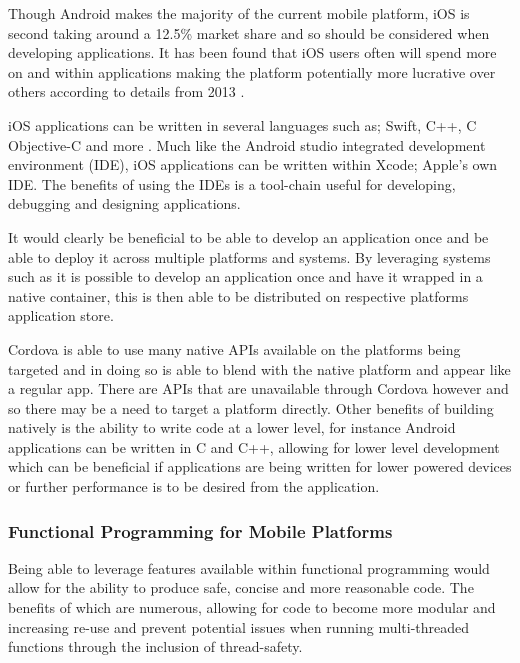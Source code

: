 Though Android makes the majority of the current mobile platform, iOS is
second taking around a 12.5\% market share \parencite{osMarketSahre} and
so should be considered when developing applications. It has been found
that iOS users often will spend more on and within applications making
the platform potentially more lucrative over others according to details
from 2013 \parencite{appMoney}.

iOS applications can be written in several languages such as; Swift,
C++, C Objective-C and more \parencite{iosDeveloperLanguage}. Much like
the Android studio integrated development environment (IDE), iOS
applications can be written within Xcode; Apple's own IDE. The benefits
of using the IDEs is a tool-chain useful for developing, debugging and
designing applications.

It would clearly be beneficial to be able to develop an application once
and be able to deploy it across multiple platforms and systems. By
leveraging systems such as \cite{cordova} it is possible to develop an
application once and have it wrapped in a native container, this is then
able to be distributed on respective platforms application store.

Cordova is able to use many native APIs available on the platforms being
targeted and in doing so is able to blend with the native platform and
appear like a regular app. There are APIs that are unavailable through
Cordova however and so there may be a need to target a platform
directly. Other benefits of building natively is the ability to write
code at a lower level, for instance Android applications can be written
in C and C++, allowing for lower level development which can be
beneficial if applications are being written for lower powered devices
or further performance is to be desired from the application.

\subsubsection{Functional Programming for Mobile
Platforms}\label{functional-programming-for-mobile-platforms}

Being able to leverage features available within functional programming
would allow for the ability to produce safe, concise and more reasonable
code. The benefits of which are numerous, allowing for code to become
more modular and increasing re-use and prevent potential issues when
running multi-threaded functions through the inclusion of thread-safety.

